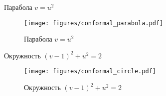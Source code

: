 \begin{frame}{Парабола \(v = u^2\)}
	\begin{figure}
		\centering
		\texttt{[image: figures/conformal\_parabola.pdf]}
		\caption{Парабола \(v=u^2\)}\label{fig:conformal_parabola}
	\end{figure}
\end{frame}

\begin{frame}{Окружность \((v-1)^2 + u^2 = 2\)}
	\begin{figure}
		\centering
		\texttt{[image: figures/conformal\_circle.pdf]}
    \caption{Окружность \((v-1)^2 + u^2 = 2\)}\label{fig:conformal_circle}
	\end{figure}
\end{frame}
